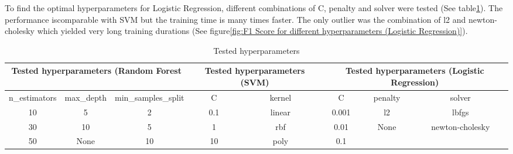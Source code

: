 \begin{enumerate}[label=\roman*.)]
To find the optimal hyperparameters for Logistic Regression, different combinations of C, penalty and solver  were tested (See table\ref{tab:Tested hyperparameters}). The performance iscomparable with SVM but the training time is many times faster. The only outlier was the combination of l2 and newton-cholesky which yielded very long training durations (See figure\ref{fig:F1 Score for different hyperparameters (Logistic Regression)}).
\begin{table}[htbp]
    \centering
    \begin{tabular}{cccccccc}\toprule
         \multicolumn{3}{c}{Tested hyperparameters (Random Forest} & \multicolumn{2}{c}{Tested hyperparameters (SVM)}& \multicolumn{3}{c}{Tested hyperparameters (Logistic Regression)}\\\midrule
         n\_estimators&  max\_depth& min\_samples\_split & C& kernel
& C& penalty&solver
\\
         10&  5& 2 & 0.1& linear
& 0.001& l2&lbfgs
\\
         30&  10& 5 & 1& rbf
& 0.01& None&newton-cholesky
\\
         50&  None& 10 & 10& poly& 0.1& &
\\ \bottomrule
    \end{tabular}
    \caption{Tested hyperparameters}
    \label{tab:Tested hyperparameters}
\end{table}



\end{enumerate}
